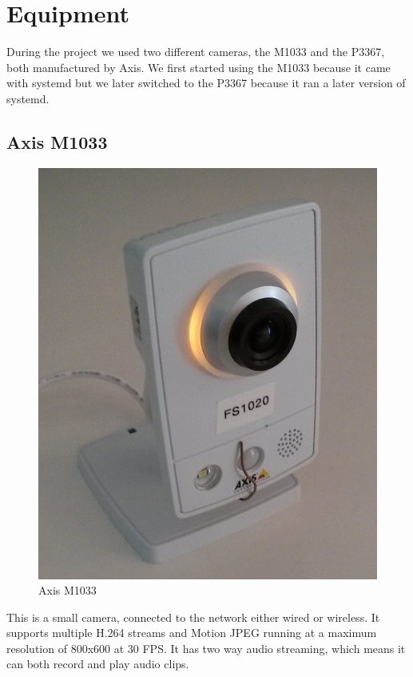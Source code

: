 \documentclass[nobiblatex]{LTHthesis}
\begin{document}
\section{Equipment} %
During the project we used two different cameras, the M1033 and the P3367, both manufactured by Axis. We first started using the M1033 because it came with systemd but we later switched to the P3367 because it ran a later version of systemd.

\subsection{Axis M1033}
\begin{figure}
    \centering
    \includegraphics[width=\textwidth]{m1033}
    \caption{Axis M1033}
    \label{fig:M1033}
\end{figure}
This is a small camera, connected to the network either wired or wireless. It supports multiple H.264 streams and Motion JPEG running at a maximum resolution of 800x600 at 30 FPS. It has two way audio streaming, which means it can both record and play audio clips.
\end{document}
